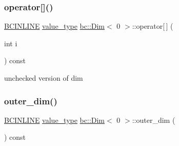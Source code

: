 \mbox{\label{structbc_1_1Dim_3_010_01_4_a09d031edb6d229770e3fd8f5f684e7d6}} 
\subsubsection{\texorpdfstring{operator[]()}{operator[]()}}
{\footnotesize\ttfamily \hyperlink{common_8h_a6699e8b0449da5c0fafb878e59c1d4b1}{B\+C\+I\+N\+L\+I\+NE} \hyperlink{structbc_1_1Dim_3_010_01_4_a561dbc6acbf3e9fe5c4a06aba2f8b968}{value\+\_\+type} \hyperlink{structbc_1_1Dim}{bc\+::\+Dim}$<$ 0 $>$\+::operator\mbox{[}$\,$\mbox{]} (\begin{DoxyParamCaption}\item[{int}]{i }\end{DoxyParamCaption}) const\hspace{0.3cm}{\ttfamily [inline]}}



unchecked version of dim 

\mbox{\label{structbc_1_1Dim_3_010_01_4_a39e33cb36054efdd6cb8474a6a93c0fc}} 
\subsubsection{\texorpdfstring{outer\+\_\+dim()}{outer\_dim()}}
{\footnotesize\ttfamily \hyperlink{common_8h_a6699e8b0449da5c0fafb878e59c1d4b1}{B\+C\+I\+N\+L\+I\+NE} \hyperlink{structbc_1_1Dim_3_010_01_4_a561dbc6acbf3e9fe5c4a06aba2f8b968}{value\+\_\+type} \hyperlink{structbc_1_1Dim}{bc\+::\+Dim}$<$ 0 $>$\+::outer\+\_\+dim (\begin{DoxyParamCaption}{ }\end{DoxyParamCaption}) const\hspace{0.3cm}{\ttfamily [inline]}}

\mbox{\label{structbc_1_1Dim_3_010_01_4_af26f741bb82cbe0b1426a112cfebdb0b}} 
